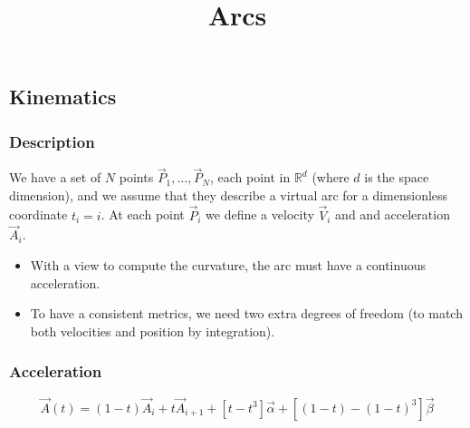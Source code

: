 \documentclass[aps,12pt]{revtex4}
\begin{document}
\title{Arcs}
\maketitle
	

\subsection{Kinematics}

\subsubsection{Description}
We have a set of $N$ points $\vec{P}_1,\ldots,\vec{P}_N$, each point in $\mathbb{R}^d$ (where $d$ is the space dimension), and we assume
that they describe a virtual arc for a dimensionless coordinate $t_i=i$.
At each point $\vec{P}_i$ we define a velocity $\vec{V}_i$ and and acceleration $\vec{A}_i$.
\begin{itemize}
\item With a view to compute the curvature, the arc must have a continuous acceleration.
\item To have a consistent metrics, we need two extra degrees of freedom (to match both velocities and position by integration).
\end{itemize}

\subsubsection{Acceleration}

\begin{equation}
	\vec{A}(t) = (1-t)\vec{A}_i + t  \vec{A}_{i+1} + \left[ t - t^3 \right] \vec{\alpha} + \left[ (1-t) - (1-t)^3 \right] \vec{\beta}
\end{equation}
\end{document}
